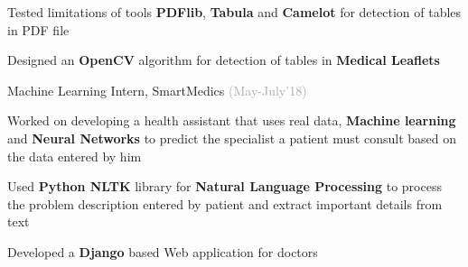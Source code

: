 \begin{cventries}
    {}
    {
      {}
      \begin{cvitems}
        \item {Tested limitations of tools \textbf{PDFlib}, \textbf{Tabula} and \textbf{Camelot} for detection of tables in PDF file}
        \vspace{0.25mm}
        \item {Designed an \textbf{OpenCV} algorithm for detection of tables in \textbf{Medical Leaflets} } \vspace{-1mm}
      \end{cvitems}
    }
  \cventry
    {}
    {Machine Learning Intern, SmartMedics}
    {\fontsize{9pt}{1em} \textcolor{darkgray}{(May-July'18)}}
    {}
    {
      {}
      \begin{cvitems}
        \item {Worked on developing a health assistant that uses real data, \textbf{Machine learning} and \textbf{Neural Networks} to predict the specialist a patient must consult based on the data entered by him}
        \vspace{0.25mm}
        \item {Used \textbf{Python NLTK} library for \textbf{Natural Language Processing} to process the problem description entered by patient and extract important details from text}
        \vspace{0.25mm}
        \item {Developed a \textbf{Django} based Web application for doctors} \vspace{-1mm}
      \end{cvitems}
    }
\end{cventries}
